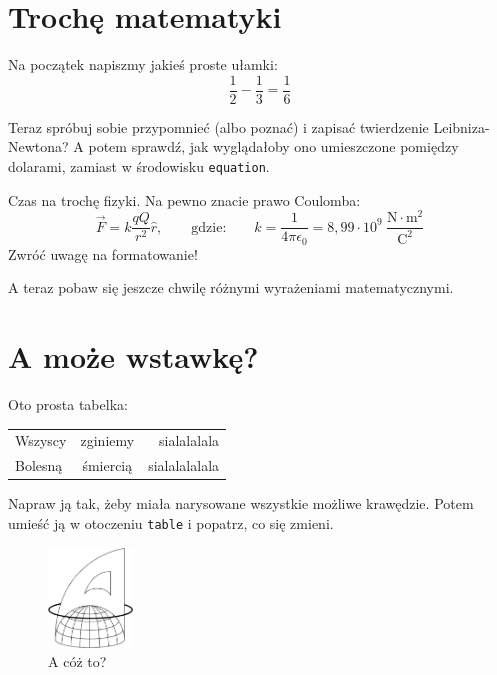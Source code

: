 \documentclass[12pt,a4paper]{article}
\begin{document}
\section{Trochę matematyki}

Na początek napiszmy jakieś proste ułamki:
\begin{equation}
\frac{1}{2} - \frac{1}{3} = \frac{1}{6}
\end{equation}

Teraz spróbuj sobie przypomnieć (albo poznać) i zapisać twierdzenie Leibniza-Newtona? A potem sprawdź, jak wyglądałoby ono umieszczone pomiędzy dolarami, zamiast w środowisku \texttt{equation}. 

Czas na trochę fizyki. Na pewno znacie prawo Coulomba:
\begin{equation}
\vec{F} = k \frac{q Q}{r^2}\hat{r}, \qquad \mbox{gdzie:} \qquad k = \frac{1}{4 \pi \epsilon_0} = 8{,}99 \cdot 10^9~\mathrm{\frac{N \cdot m^2}{C^2}}
\end{equation}
Zwróć uwagę na formatowanie!

A teraz pobaw się jeszcze chwilę różnymi wyrażeniami matematycznymi. 

\section{A może wstawkę?}

Oto prosta tabelka:

\begin{tabular}{|lc|r|} \hline
Wszyscy & zginiemy & sialalalala \\
Bolesną  & śmiercią & sialalalalala \\
\end{tabular}
Napraw ją tak, żeby miała narysowane wszystkie możliwe krawędzie. Potem umieść ją w otoczeniu \texttt{table} i popatrz, co się zmieni. 

\begin{figure}
\begin{center}
\includegraphics[width=0.2\textwidth]{logo.png}
\end{center}
\caption{\label{logo} A cóż to?}
\end{figure}
\end{document}
